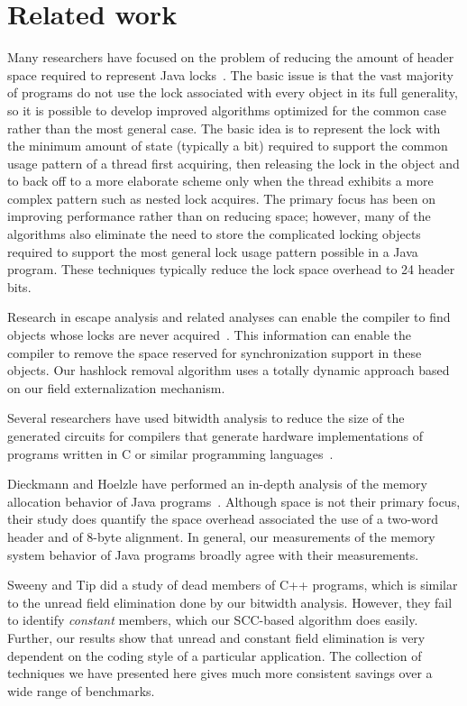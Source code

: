 \documentclass{acmconf}
\begin{document}
\section{Related work}

Many researchers have focused on the problem of reducing the amount of
header space required to represent Java
locks~\cite{BKMS98,OK99,ADGKRW99}. The basic issue is that the vast
majority of programs do not use the lock associated with every object
in its full generality, so it is possible to develop improved
algorithms optimized for the common case rather than the most general
case. The basic idea is to represent the lock with the minimum amount
of state (typically a bit) required to support the common usage
pattern of a thread first acquiring, then releasing the lock in the
object and to back off to a more elaborate scheme only when the thread
exhibits a more complex pattern such as nested lock acquires. The
primary focus has been on improving performance rather than on
reducing space; however, many of the algorithms also eliminate the
need to store the complicated locking objects required to support the
most general lock usage pattern possible in a Java program. These
techniques typically reduce the lock space overhead to 24 header bits.

Research in escape analysis and related analyses can enable the
compiler to find objects whose locks are never 
acquired~\cite{ACSE99,BH99,WR99:OOPSLA99,CGSSM99,Ruf00:PLDI00,SR01:PPOPP01}.
This information can enable the compiler to remove the space
reserved for synchronization support in these objects. 
Our hashlock removal algorithm uses a totally dynamic approach
based on our field externalization mechanism. 

Several researchers have used bitwidth analysis to reduce the size
of the generated circuits for compilers that generate hardware
implementations of programs written in C or similar programming 
languages~\cite{ananian:siliconc,RR00:PLDI00,SBA00:PLDI00,BGSW00}.

Dieckmann and Hoelzle have performed an in-depth analysis of the
memory allocation behavior of Java programs~\cite{DH99}. Although 
space is not their primary focus, their study does quantify 
the space overhead associated the use of a two-word header
and of 8-byte alignment. In general, our measurements of the 
memory system behavior of Java programs broadly agree with their
measurements. 

Sweeny and Tip \cite{SweeneyTip98DeadDataMembers} did a study of dead
members of C++ programs, which is similar to the unread field
elimination done by our bitwidth analysis.  However, they
fail to identify {\it constant} members, which our SCC-based algorithm
does easily.  Further, our results show that unread and constant field
elimination is very dependent on the coding style of a particular
application.  The collection of techniques we have presented here
gives much more consistent savings over a wide range of benchmarks.
\end{document}
